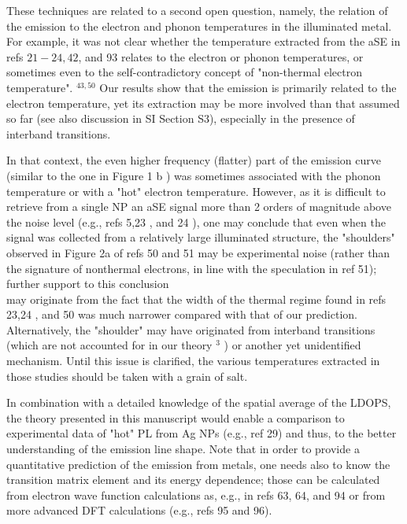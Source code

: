 \documentclass[10pt]{article}
\begin{document}
These techniques are related to a second open question, namely, the relation of the emission to the electron and phonon temperatures in the illuminated metal. For example, it was not clear whether the temperature extracted from the aSE in refs $21-24,42$, and 93 relates to the electron or phonon temperatures, or sometimes even to the self-contradictory concept of "non-thermal electron temperature". ${ }^{43,50}$ Our results show that the emission is primarily related to the electron temperature, yet its extraction may be more involved than that assumed so far (see also discussion in SI Section S3), especially in the presence of interband transitions.

In that context, the even higher frequency (flatter) part of the emission curve (similar to the one in Figure 1 b ) was sometimes associated with the phonon temperature or with a "hot" electron temperature. However, as it is difficult to retrieve from a single NP an aSE signal more than 2 orders of magnitude above the noise level (e.g., refs 5,23 , and 24 ), one may conclude that even when the signal was collected from a relatively large illuminated structure, the "shoulders" observed in Figure 2a of refs 50 and 51 may be experimental noise (rather than the signature of nonthermal electrons, in line with the speculation in ref 51); further support to this conclusion\\
may originate from the fact that the width of the thermal regime found in refs 23,24 , and 50 was much narrower compared with that of our prediction. Alternatively, the "shoulder" may have originated from interband transitions (which are not accounted for in our theory ${ }^{3}$ ) or another yet unidentified mechanism. Until this issue is clarified, the various temperatures extracted in those studies should be taken with a grain of salt.

In combination with a detailed knowledge of the spatial average of the LDOPS, the theory presented in this manuscript would enable a comparison to experimental data of "hot" PL from Ag NPs (e.g., ref 29) and thus, to the better understanding of the emission line shape. Note that in order to provide a quantitative prediction of the emission from metals, one needs also to know the transition matrix element and its energy dependence; those can be calculated from electron wave function calculations as, e.g., in refs 63, 64, and 94 or from more advanced DFT calculations (e.g., refs 95 and 96).
\end{document}
